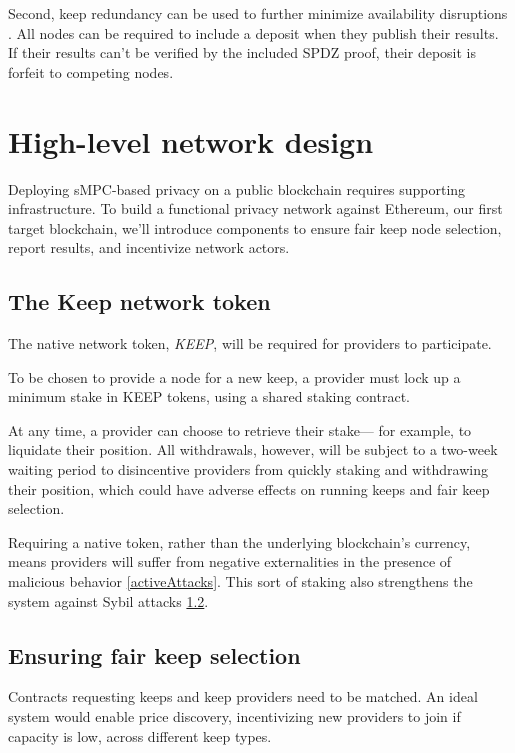 \documentclass[11pt]{article}
\begin{document}
Second, keep redundancy can be used to further minimize availability
disruptions \cite{blockchainMultipartyComputation}. All nodes can be
required to include a deposit when they publish their results. If
their results can't be verified by the included SPDZ proof, their
deposit is forfeit to competing nodes.

\section{High-level network design}

Deploying sMPC-based privacy on a public blockchain requires
supporting infrastructure. To build a functional privacy network
against Ethereum, our first target blockchain, we'll introduce
components to ensure fair keep node selection, report results, and
incentivize network actors.

\subsection{The Keep network token}

The native network token, \textit{KEEP}, will be required for
providers to participate.

To be chosen to provide a node for a new keep, a provider must lock up
a minimum stake in KEEP tokens, using a shared staking contract.

At any time, a provider can choose to retrieve their stake--- for
example, to liquidate their position. All withdrawals, however, will
be subject to a two-week waiting period to disincentive providers from
quickly staking and withdrawing their position, which could have
adverse effects on running keeps and fair keep selection.

Requiring a native token, rather than the underlying blockchain's
currency, means providers will suffer from negative externalities in
the presence of malicious behavior \ref{activeAttacks}. This sort of
staking also strengthens the system against Sybil attacks
\ref{fairKeepSelection}.

\subsection{Ensuring fair keep selection}
\label{fairKeepSelection}

Contracts requesting keeps and keep providers need to be matched. An
ideal system would enable price discovery, incentivizing new providers
to join if capacity is low, across different keep types.
\end{document}
